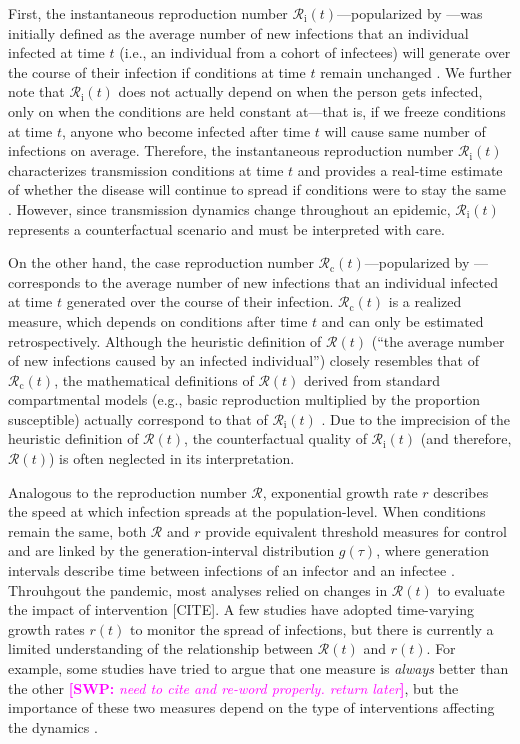 \documentclass[12pt]{article}
\newcommand{\comment}{\showcomment}
\newcommand{\showcomment}[3]{\textcolor{#1}{\textbf{[#2: }\textsl{#3}\textbf{]}}}
\newcommand{\swp}[1]{\comment{magenta}{SWP}{#1}}
\newcommand{\Rx}[1]{\ensuremath{{\mathcal R}_{#1}}\xspace}
\newcommand{\Rc}{\Rx{\mathrm{c}}}
\newcommand{\Ri}{\Rx{\mathrm{i}}}
\newcommand{\RR}{\ensuremath{{\mathcal R}}\xspace}
\begin{document}
First, the instantaneous reproduction number $\Ri(t)$---popularized by \cite{cori2013new}---was initially defined as the average number of new infections that an individual infected at time $t$ (i.e., an individual from a cohort of infectees) will generate over the course of their infection if conditions at time $t$ remain unchanged \citep{fraser2007estimating}. 
We further note that $\Ri(t)$ does not actually depend on when the person gets infected, only on when the conditions are held constant at---that is, if we freeze conditions at time $t$, anyone who become infected after time $t$ will cause same number of infections on average.
Therefore, the instantaneous reproduction number $\Ri(t)$ characterizes transmission conditions at time $t$ and provides a real-time estimate of whether the disease will continue to spread if conditions were to stay the same \citep{gostic2020practical}.
However, since transmission dynamics change throughout an epidemic, $\Ri(t)$ represents a counterfactual scenario and must be interpreted with care.

On the other hand, the case reproduction number $\Rc(t)$---popularized by \cite{wallinga2004different}---corresponds to the average number of new infections that an individual infected at time $t$ generated over the course of their infection.
$\Rc(t)$ is a realized measure, which depends on conditions after time $t$ and can only be estimated retrospectively.
Although the heuristic definition of $\RR(t)$ (``the average number of new infections caused by an infected individual'') closely resembles that of $\Rc(t)$, the mathematical definitions of $\RR(t)$ derived from standard compartmental models (e.g., basic reproduction multiplied by the proportion susceptible) actually correspond to that of $\Ri(t)$ \citep{gostic2020practical}.
Due to the imprecision of the heuristic definition of $\RR(t)$, the counterfactual quality of $\Ri(t)$ (and therefore, $\RR(t)$) is often neglected in its interpretation.

Analogous to the reproduction number $\RR$, exponential growth rate $r$ describes the speed at which infection spreads at the population-level.
When conditions remain the same, both $\RR$ and $r$ provide equivalent threshold measures for control and are linked by the generation-interval distribution $g(\tau)$, where generation intervals describe time between infections of an infector and an infectee \citep{svensson2007note}.
Throuhgout the pandemic, most analyses relied on changes in $\RR(t)$ to evaluate the impact of intervention [CITE].
A few studies have adopted time-varying growth rates $r(t)$ to monitor the spread of infections, but there is currently a limited understanding of the relationship between $\RR(t)$ and $r(t)$.
For example, some studies have tried to argue that one measure is \emph{always} better than the other  \swp{need to cite and re-word properly. return later}, but the importance of these two measures depend on the type of interventions affecting the dynamics \cite{dushoff2021speed}.
\end{document}
